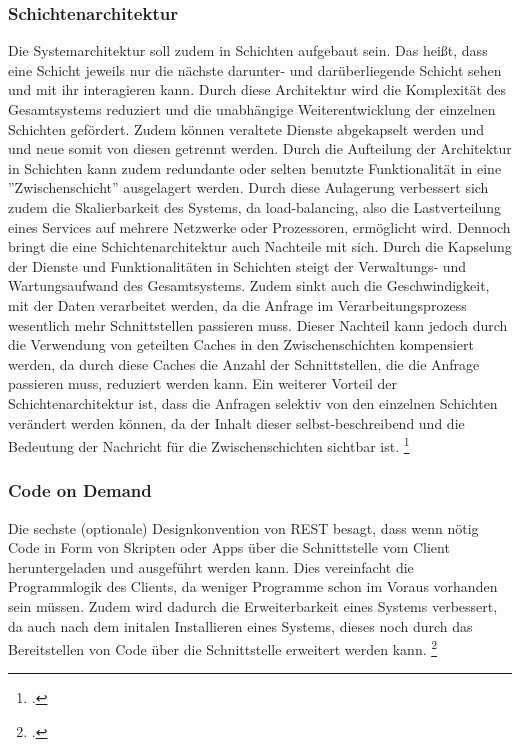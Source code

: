 \subsubsection{Schichtenarchitektur}

Die Systemarchitektur soll zudem in Schichten aufgebaut sein. Das hei{\ss}t, dass eine Schicht jeweils nur die nächste darunter- und darüberliegende Schicht sehen und mit ihr interagieren kann. Durch diese Architektur wird die Komplexität des Gesamtsystems reduziert und die unabhängige Weiterentwicklung der einzelnen Schichten gefördert. Zudem können veraltete Dienste abgekapselt werden und und neue somit von diesen getrennt werden. Durch die Aufteilung der Architektur in Schichten kann zudem redundante oder selten benutzte Funktionalität in eine ''Zwischenschicht'' ausgelagert werden. Durch diese Aulagerung verbessert sich zudem die Skalierbarkeit des Systems, da load-balancing, also die Lastverteilung eines Services auf mehrere Netzwerke oder Prozessoren, ermöglicht wird. Dennoch bringt die eine Schichtenarchitektur auch Nachteile mit sich. Durch die Kapselung der Dienste und Funktionalitäten in Schichten steigt der Verwaltungs- und Wartungsaufwand des Gesamtsystems. Zudem sinkt auch die Geschwindigkeit, mit der Daten verarbeitet werden, da die Anfrage im Verarbeitungsprozess wesentlich mehr Schnittstellen passieren muss. Dieser Nachteil kann jedoch durch die Verwendung von geteilten Caches in den Zwischenschichten kompensiert werden, da durch diese Caches die Anzahl der Schnittstellen, die die Anfrage passieren muss, reduziert werden kann. Ein weiterer Vorteil der Schichtenarchitektur ist, dass die Anfragen selektiv von den einzelnen Schichten verändert werden können, da der Inhalt dieser selbst-beschreibend und die Bedeutung der Nachricht für die Zwischenschichten sichtbar ist. \footcite[Vgl.][]{fielding_architectural_2000}

\subsubsection{Code on Demand}

Die sechste (optionale) Designkonvention von REST besagt, dass wenn nötig Code in Form von Skripten oder Apps über die Schnittstelle vom Client heruntergeladen und ausgeführt werden kann. Dies vereinfacht die Programmlogik des Clients, da weniger Programme schon im Voraus vorhanden sein müssen. Zudem wird dadurch die Erweiterbarkeit eines Systems verbessert, da auch nach dem initalen Installieren eines Systems, dieses noch durch das Bereitstellen von Code über die Schnittstelle erweitert werden kann. \footcite[Vgl.][]{fielding_architectural_2000}


